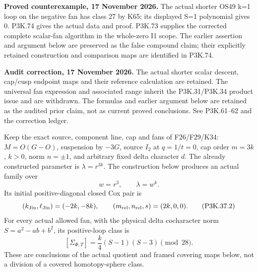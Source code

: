 \begin{theorem}\label{night:P3K.37}
\par\noindent\textbf{Proved counterexample, 17 November 2026.} The actual shorter OS49 k=1 loop on the negative fan has class 27 by K65; its displayed S=1 polynomial gives 0. P3K.74 gives the actual data and proof. P3K.73 supplies the corrected complete scalar-fan algorithm in the whole-zero I1 scope. The earlier assertion and argument below are preserved as the false compound claim; their explicitly retained construction and comparison maps are identified in P3K.74.

\par\noindent\textbf{Audit correction, 17 November 2026.} The actual shorter scalar descent, cap/cusp endpoint maps and their reference calculation are retained. The universal fan expression and associated range inherit the P3K.31/P3K.34 product issue and are withdrawn. The formulas and earlier argument below are retained as the audited prior claim, not as current proved conclusions. See P3K.61--62 and the correction ledger.
\medskip

Keep the exact source, component line, cap and fans of F26/F29/K34:
\(M=O(G-O)\), suspension by \(-3G\), source \(I_2\) at
\(q=1/t=0\), cap order \(m=3k\), \(k>0\), norm
\(n=\pm1\), and arbitrary fixed delta character \(d\).
The already constructed parameter is \(\lambda=r^{3k}\).
The construction below produces an actual family over
\[
 w=r^3,\qquad \lambda=w^k.                                      \tag{P3K.37.1}
\]
Its initial positive-diagonal closed Cox pair is
\[
 (k_{\rm Jin},\ell_{\rm Jin})=(-2k,-8k),\qquad
 (m_{\rm rel},n_{\rm rel},s)=(2k,0,0).
                                                                    \tag{P3K.37.2}
\]
For every actual allowed fan, with the physical delta cocharacter norm
\(S=a^2-ab+b^2\), its positive-loop class is
\[
 [\Sigma_{\Phi,T}]=\frac{k}{4}(S-1)(S-3)\pmod {28}.              \tag{P3K.37.3}
\]
These are conclusions of the actual quotient and framed covering maps below,
not a division of a covered homotopy-sphere class.
\end{theorem}
